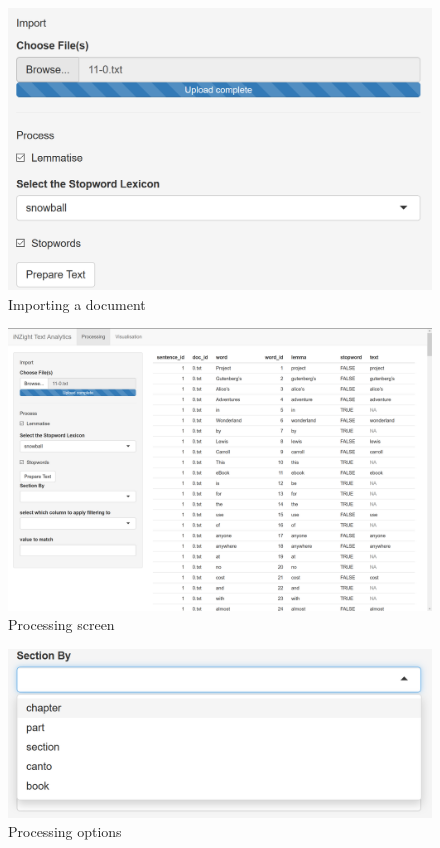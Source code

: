 \documentclass[11pt, a4paper, oneside]{report}
\begin{document}
\begin{figure}
\centering
\includegraphics[scale=0.7]{processing-import-process.png}
\caption{Importing a document\label{fig:processing-import-pro}}
\end{figure}

\begin{figure}
\centering
\includegraphics[scale=0.4]{processing-overview.png}
\caption{Processing screen\label{fig:processing-overview}}
\end{figure}

\begin{figure}
\centering
\includegraphics[scale=0.7]{processing-section.png}
\caption{Processing options\label{fig:processing-section}}
\end{figure}
\end{document}
